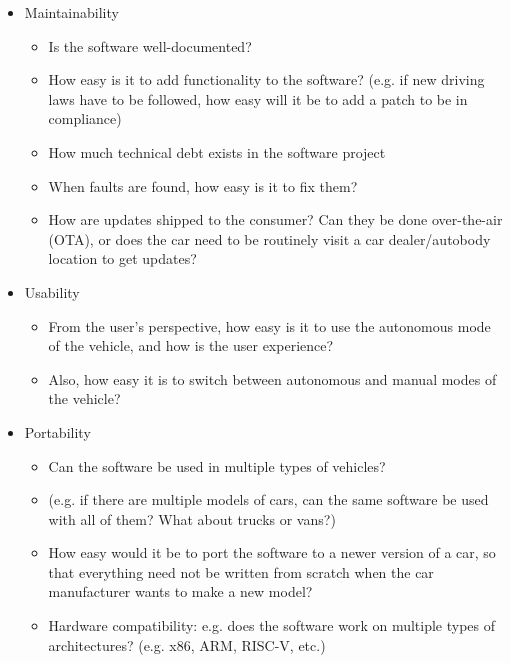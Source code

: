 \documentclass[letterpaper]{article}
\begin{document}
\begin{itemize}
	\item Maintainability
	      \begin{itemize}
		      \item Is the software well-documented?
		      \item How easy is it to add functionality to the software? (e.g. if new driving laws have to be followed, how easy will it be to add a patch to be in compliance)
		      \item How much technical debt exists in the software project
		      \item When faults
		            are found, how easy is it to fix them?
		      \item How are updates shipped to the consumer? Can they be done over-the-air (OTA), or does the car need to be routinely visit a car dealer/autobody location to get updates?
	      \end{itemize}

	\item Usability
	      \begin{itemize}
		      \item From the user's perspective, how easy is it to use the autonomous mode of the vehicle, and how is the user experience?
		      \item Also, how easy it is to switch between autonomous and manual modes of the vehicle?
	      \end{itemize}

	\item Portability
	      \begin{itemize}
		      \item Can the software be used in multiple types of vehicles?
		      \item (e.g. if there are multiple models of cars, can the same software be used with all of them? What about trucks or vans?)
		      \item How easy would it be to port the software to a newer version of a car, so that everything need not be written from scratch
		            when the car manufacturer wants to make a new model?
		      \item Hardware compatibility: e.g. does the software work on multiple types of architectures? (e.g. x86, ARM, RISC-V, etc.)
	      \end{itemize}
\end{itemize}
\end{document}
